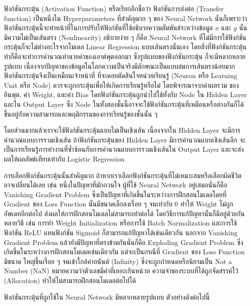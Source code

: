 ฟังก์ชันกระตุ้น (Activation Function) หรือเรียกอีกชื่อว่า ฟังก์ชันการส่งต่อ (Transfer function) เป็นหนึ่งใน Hyperparameters 
ที่สำคัญมาก ๆ ของ Neural Network นั่นก็เพราะว่าฟังก์ชันกระตุ้นนี้จะทำหน้าที่ในการปรับให้ฟังก์ชันที่ใช้อธิบายความสัมพันธ์ระหว่างข้อมูล $x$ 
และ $y$ นั้นมีความไม่เป็นเส้นตรง (Nonlinearity) อธิบายง่าย ๆ ก็คือ Neural Network ที่ไม่มีการใช้ฟังก์ชันกระตุ้นก็จะไม่ต่างอะไรจากโมเดล
Linear Regression แบบเส้นตรงนั่นเอง โดยสิ่งที่ฟังก์ชันกระตุ้นทำก็คือจะทำการคำนวณทำนายค่าของเอาต์พุตออกมา ซึ่งรูปแบบของฟังก์ชันกระตุ้น%
ก็จะมีหลากหลายรูปแบบ เนื่องจากปัญหาของข้อมูลในโลกความเป็นจริงมีลักษณะเป็นแบบสมการเส้นตรงน้อยมาก ฟังก์ชันกระตุ้นจึงเป็นเหมือนเจ้าหน้าที่%
ที่จะคอยตัดสินใจหน่วยเรียนรู้ (Neuron หรือ Learning Unit หรือ Node) ควรจะถูกกระตุ้นเพื่อให้เกิดการเรียนรู้หรือไม่ โดยพิจารณาจากค่าผลรวม%
ของอินพุต, ค่า Weight, และค่า Bias โดยฟังก์ชันกระตุ้นถูกนำไปใช้ทั้งกับ Node ใน Hidden Layer และใน Output Layer ซึ่ง Node 
ในทั้งสองชั้นนี้อาจจะใช้ฟังก์ชันกระตุ้นที่เหมือนหรือต่างกันก็ได้ ขึ้นอยู่กับความสามารถและพฤติกรรมของการเรียนรู้ของชั้นนั้น ๆ 

โดยส่วนมากแล้วเราจะใช้ฟังก์ชันกระตุ้นแบบไม่เป็นเชิงเส้น เนื่องจากใน Hidden Layer จะมีการคำนวณแบบการรวมเชิงเส้น ถ้าฟังก์ชันกระตุ้นของ 
Hidden Layer มีการคำนวณแบบเชิงเส้นอีก จะเป็นการเรียนรู้การทำงานที่ซ้ำซ้อนกับการคำนวณแบบการรวมเชิงเส้นใน Output Layer 
และจะส่งผลให้ผลลัพธ์เทียบเท่ากับ Logistic Regression 

การเลือกฟังก์ชันกระตุ้นนั้นสำคัญมาก ถ้าหากเราเลือกฟังก์ชันกระตุ้นที่ไม่เหมาะสมหรือเลือกผิดชีวิตอาจเปลี่ยนได้เลย เช่น หนึ่งในปัญหาที่มักกวนใจ%
ผู้ที่ใช้ Neural Network อยู่เสมอนั่นก็คือ Vanishing Gradient Problem ซึ่งเป็นปัญหาที่เกิดขึ้นในระหว่างการฝึกสอนโมเดลโดยที่ Gradient 
ของ Loss Function นั้นมีขนาดเล็กลงเรื่อย ๆ จนเท่ากับ 0 ทำให้ Weight ไม่ถูกอัพเดทอีกต่อไป ส่งผลให้การฝึกสอนโมเดลไม่สามารถทำต่อได้
โดยวิธีการแก้ปัญหานั้นก็มีอยู่ด้วยกันหลายวิธี เช่น การทำ Weight Initialization หรือการใช้ Batch Normalization และการใช้ฟังก์ชัน 
ReLU แทนฟังก์ชัน Sigmoid ก็สามารถแก้ปัญหาได้เช่นเดียวกัน นอกจาก Vanishing Gradient Problem แล้วยังมีปัญหาที่ตรงข้ามกันนั่นก็คือ 
Exploding Gradient Problem ซึ่งเกิดขึ้นในระหว่างการฝึกสอนโมเดลเช่นเดียวกัน แต่จะเป็นกรณีที่ Gradient ของ Loss Function มีขนาด%
ใหญ่ขึ้นเรื่อย ๆ จนเข้าใกล้ค่าอนันต์ (Infinity) ซึ่งจะถูกกำหนดหรือนิยามเป็น Not a Number (NaN) หมายความว่าตัวเลขมีค่าที่เยอะเกินหน่วย%
ความจำของระบบที่ได้ถูกจัดสรรค์ไว้ (Allocation) ทำให้ไม่สามารถฝึกสอนโมเดลต่อไปได้

ฟังก์ชันกระตุ้นที่ถูกใช้ใน Neural Network มีหลากหลายรูปแบบ ตัวอย่างดังต่อไปนี้

